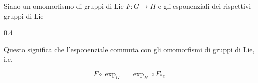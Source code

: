 \begin{definition}\label{prop:homo-lie-exp-comm}
	Siano un omomorfismo di gruppi di Lie $ F : G \to H $ e gli esponenziali dei rispettivi gruppi di Lie
	
		{0.4}{%
				}
	
	Questo significa che l'esponenziale commuta con gli omomorfismi di gruppi di Lie, i.e.
	
	\begin{equation}
		F \circ \exp_{G} = \exp_{H} \circ F_{*e}
	\end{equation}
\end{definition}

